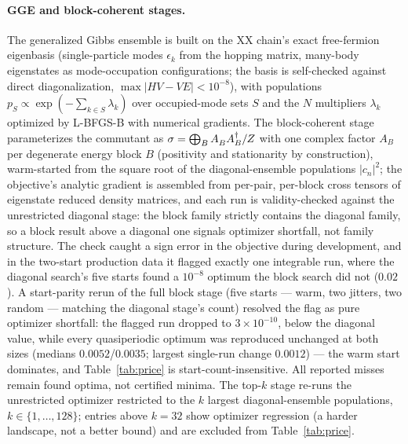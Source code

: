 \documentclass[a4paper,11pt,noarxiv]{quantumarticle}
\begin{document}
\paragraph{GGE and block-coherent stages.} The generalized Gibbs
ensemble is built on the XX chain's exact free-fermion eigenbasis
(single-particle modes $\epsilon_k$ from the hopping matrix,
many-body eigenstates as mode-occupation configurations; the basis is
self-checked against direct diagonalization, $\max|HV - VE| <
10^{-8}$), with populations $p_S \propto \exp(-\sum_{k \in S}
\lambda_k)$ over occupied-mode sets $S$ and the $N$ multipliers
$\lambda_k$ optimized by L-BFGS-B with numerical gradients. The
block-coherent stage parameterizes the commutant as $\sigma =
\bigoplus_B A_B^{\vphantom\dagger} A_B^\dagger / Z$ with one complex
factor $A_B$ per degenerate energy block $B$ (positivity and
stationarity by construction), warm-started from the square root of
the diagonal-ensemble populations $|c_n|^2$; the objective's analytic
gradient is
assembled from per-pair, per-block cross tensors of eigenstate
reduced density matrices, and each run is validity-checked against
the unrestricted diagonal stage: the block family strictly contains
the diagonal family, so a block result above a diagonal one signals
optimizer shortfall, not family structure. The check caught a sign
error in the objective during development, and in the two-start
production data it flagged exactly one integrable run, where the
diagonal search's five starts found a $10^{-8}$ optimum the block
search did not ($0.02$). A start-parity rerun of the full block
stage (five starts --- warm, two jitters, two random --- matching
the diagonal stage's count) resolved the flag as pure optimizer
shortfall: the flagged run dropped to $3\times10^{-10}$, below the
diagonal value, while every quasiperiodic optimum was reproduced
unchanged at both sizes (medians $0.0052$/$0.0035$; largest
single-run change $0.0012$) --- the warm start dominates, and
Table~\ref{tab:price} is start-count-insensitive. All reported
misses remain found optima, not certified minima. The top-$k$ stage
re-runs the
unrestricted optimizer restricted to the $k$ largest diagonal-ensemble
populations, $k \in \{1, \dots, 128\}$; entries above $k = 32$ show
optimizer regression (a harder landscape, not a better bound) and are
excluded from Table~\ref{tab:price}.
\end{document}
